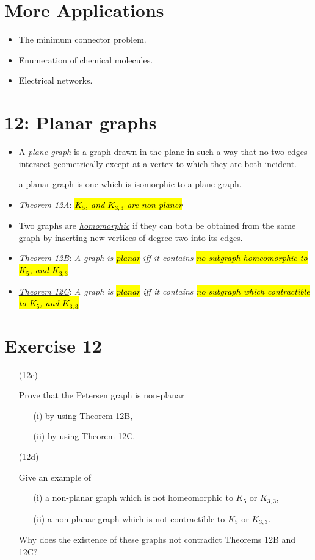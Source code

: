 \documentclass[12pt,a4paper, twocolumn]{article}
\begin{document}
\section*{More Applications}
\begin{itemize}
	\item The minimum connector problem.
	\item Enumeration of chemical molecules.
	\item Electrical networks.
\end{itemize}

\section*{12: Planar graphs}
\begin{itemize}
		\item A \underline{\emph{\color{magenta} plane graph}} is a graph drawn in the plane in such a way that no two edges intersect geometrically except at a vertex to which they are both incident. \begin{small} a planar graph is one which is isomorphic to a plane graph.\end{small}
				\item \underline{\emph{\color{magenta} Theorem 12A}}: \emph{\hl{$K_5$, and $K_{3,3}$ are non-planer}}
				\item Two graphs are \underline{\emph{\color{magenta} homomorphic}} if they can both be obtained from the same graph by inserting new vertices of degree two into its edges.
				\item \underline{\emph{\color{magenta} Theorem 12B}}: \emph{A graph is \hl{planar} iff it contains \hl{no subgraph homeomorphic to $K_5$, and $K_{3,3}$}}
				\item \underline{\emph{\color{magenta} Theorem 12C}}: \emph{A graph is \hl{planar} iff it contains \hl{no subgraph which contractible to $K_5$, and $K_{3,3}$}}


\end{itemize}
\section*{Exercise 12}
\begin{itemize}
	\item[(12c)] {\color{blue}Prove that the Petersen graph is non-planar
					\begin{itemize}
							\item[(i)] by using Theorem 12B,
							\item[(ii)] by using Theorem 12C.
						\end{itemize}
			}
	\item[(12d)] {\color{blue} Give an example of
					\begin{itemize}
						\item[(i)] a non-planar graph which is not homeomorphic to $K_5$ or $K_{3,3}$,
						\item[(ii)] a non-planar graph which is not contractible to $K_5$ or $K_{3,3}$.								
					\end{itemize}
					Why does the existence of these graphs not contradict Theorems 12B and 12C?
			
			}
\end{itemize}
\end{document}
